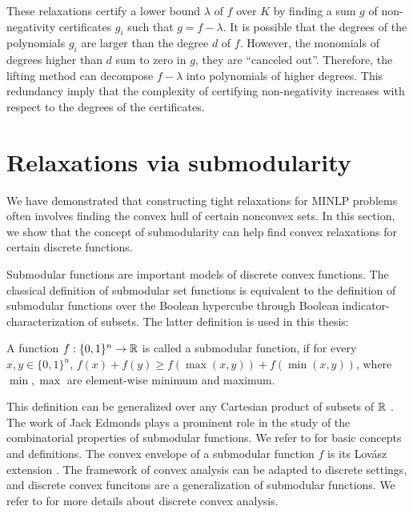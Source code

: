 These relaxations  certify a lower bound $\lambda$ of $f$ over $K$ by finding a sum $g$ of non-negativity certificates $g_i$ such that $g = f - \lambda$. It is possible that the degrees of the polynomials $g_i$ are larger than the degree $d$ of $f$. However, the monomials of degrees higher than $d$ sum to zero in $g$, \ie they are ``canceled out''. Therefore, the lifting method can decompose $f - \lambda$ into polynomials of higher degrees. This redundancy imply that the complexity of certifying non-negativity increases with respect to the degrees of the certificates.


\section{Relaxations via submodularity}
We have demonstrated that constructing tight relaxations for MINLP problems often involves finding the convex hull of certain nonconvex sets. In this section, we show that the concept of submodularity can help find convex relaxations for certain discrete functions.

 Submodular functions are important models of discrete convex functions.  The classical definition of submodular set  functions \cite{lovasz1983submodular} is equivalent to the definition of submodular functions over the Boolean hypercube through Boolean indicator-characterization of subsets. The latter definition is used in this thesis: 

 \begin{definition}
      A function $f: \{0,1\}^n  \to \mathbb R$ is called a submodular function, if
for every $x,  y \in \{0,1\}^n$, $f(x) + f(y) \ge f ( \max(x, y) ) + f( \min(x, y))$, where $\min,\max$ are element-wise minimum and maximum.
 \end{definition}

This definition can be generalized over any Cartesian product of subsets of $\mathbb R$ \cite{topkis2011supermodularity}.
  The work of Jack Edmonds \cite{edmonds2003submodular} plays a prominent role in the study of the combinatorial properties of submodular functions. We refer to \cite{schrijver2003combinatorial} for basic concepts and definitions. The convex envelope of a submodular function $f$ is its Lovász extension  \cite{Atamturk2021,lovasz1983submodular}.  The framework of convex analysis can be adapted to discrete settings, and discrete convex funcitons are a generalization of submodular functions. We refer to \cite{murota1998discrete} for  more details about discrete convex analysis.  

